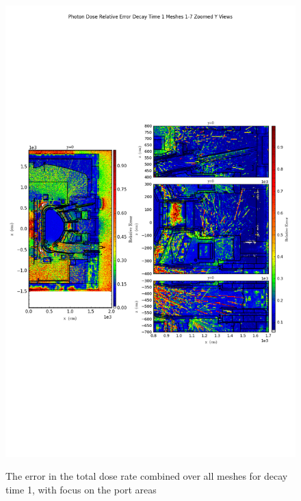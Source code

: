 \documentclass[12pt]{article}
\begin{document}
\begin{figure}[ht!]
\centering
\includegraphics[trim={0cm 9cm 0cm 10cm},clip,scale=0.75]{../plots/final_model_nob4c/Photon_Dose_Relative_Error_Decay_Time_1_Meshes_1-7_Zoomed_Y_Views.png}
\label{fig:photons_dc1_no4bc_total_error_zoomed}
\caption{The error in the total dose rate combined over all meshes for decay time 1, with focus on the port areas}
\end{figure}

\clearpage
\end{document}
